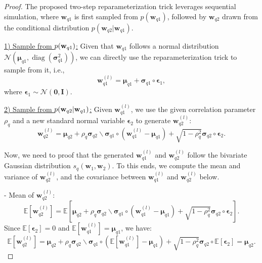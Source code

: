\begin{proof}

The proposed two-step reparameterization trick leverages sequential simulation, where \(\mathbf{w}_{q1}\) is first sampled from \( p(\mathbf{w}_{q1}) \), followed by \(\mathbf{w}_{q2}\) drawn from the conditional distribution \( p(\mathbf{w}_{q2} \vert \mathbf{w}_{q1}) \).

\underline{1) Sample from $p({\mathbf w}_{q1})$:} 
Given that $\mathbf{w}_{q1}$ follows a normal distribution $\mathcal{N}(\bm{\mu}_{q1}, \operatorname{diag}(\bm{\sigma}_{q1}^2))$,  we can directly use the reparameterization trick to sample from it, i.e., 
\[ \mathbf{w}_{q1}^{(l)} = \bm{\mu}_{q1} + \bm{\sigma}_{q1} \circ  \bm{\epsilon}_1, \]
where $\bm{\epsilon}_1 \sim \mathcal{N}(\bm{0}, \mathbf{I})$. 


\underline{2) Sample from $p({\mathbf w}_{q2} \vert {\mathbf w}_{q1})$:}  Given $\mathbf{w}_{q1}^{(l)}$, we use the given correlation parameter $\rho_q$ and a new standard normal variable $\bm{\epsilon}_2$ to generate $\mathbf{w}_{q2}^{(l)}$:
   \[ \mathbf{w}_{q2}^{(l)} = \bm{\mu}_{q2} + \rho_q \bm{\sigma}_{q2} \backslash \bm{\sigma}_{q1} \circ (\mathbf{w}_{q1}^{(l)} - \bm{\mu}_{q1}) + \sqrt{1 - \rho_q^2}  \bm{\sigma}_{q2} \circ \bm{\epsilon}_2. \]

Now, we need to proof that the generated $\mathbf{w}_{q1}^{(l)}$ and $\mathbf{w}_{q2}^{(l)}$ follow the bivariate Gaussian distribution $s_q(\mathbf{w}_1, \mathbf{w}_2)$. To this ends, we compute the mean and variance of $\mathbf{w}_{q2}^{(l)}$, and the covariance between $\mathbf{w}_{q1}^{(l)}$ and $\mathbf{w}_{q2}^{(l)}$ below. 

   - Mean of $\mathbf{w}_{q2}^{(l)}$:
     \[
     \mathbb{E}[\mathbf{w}_{q2}^{(l)}] = \mathbb{E}\left[\bm{\mu}_{q2} + \rho_q \bm{\sigma}_{q2} \backslash \bm{\sigma}_{q1} \circ  (\mathbf{w}_{q1}^{(l)} - \bm{\mu}_{q1}) + \sqrt{1 - \rho_q^2} \bm{\sigma}_{q2} \circ \bm{\epsilon}_2 \right].
     \]
     Since $\mathbb{E}[\bm{\epsilon}_2] = 0$ and $\mathbb{E}[\mathbf{w}_{q1}^{(l)}] = \bm{\mu}_{q1}$, we have:
     \[
     \mathbb{E}[\mathbf{w}_{q2}^{(l)}] = \bm{\mu}_{q2} + \rho_q \bm{\sigma}_{q2} \backslash \bm{\sigma}_{q1} \circ  (\mathbb{E}[\mathbf{w}_{q1}^{(l)}] - \bm{\mu}_{q1}) + \sqrt{1 - \rho_q^2}  \bm{\sigma}_{q2} \circ \mathbb{E}[\bm{\epsilon}_2]= \bm{\mu}_{q2}.
     \]


\end{proof}
